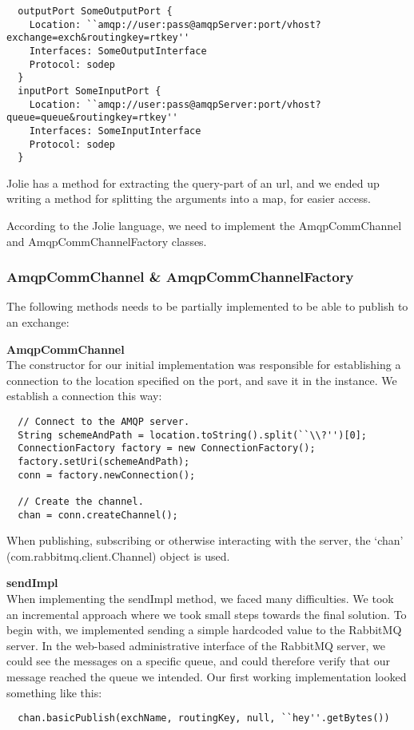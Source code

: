 \begin{lstlisting}
  outputPort SomeOutputPort {
    Location: ``amqp://user:pass@amqpServer:port/vhost?exchange=exch&routingkey=rtkey''
    Interfaces: SomeOutputInterface
    Protocol: sodep
  }
  inputPort SomeInputPort {
    Location: ``amqp://user:pass@amqpServer:port/vhost?queue=queue&routingkey=rtkey''
    Interfaces: SomeInputInterface
    Protocol: sodep
  }
\end{lstlisting}
Jolie has a method for extracting the query-part of an url, and we ended up writing a method for splitting the arguments into a map, for easier access.

According to the Jolie language, we need to implement the AmqpCommChannel and AmqpCommChannelFactory classes.
\subsubsection{AmqpCommChannel \& AmqpCommChannelFactory}
The following methods needs to be partially implemented to be able to publish to an exchange:

\noindent\textbf{AmqpCommChannel}\\
The constructor for our initial implementation was responsible for establishing a connection to the location specified on the port, and save it in the instance. We establish a connection this way:
\begin{lstlisting}
  // Connect to the AMQP server.
  String schemeAndPath = location.toString().split(``\\?'')[0];
  ConnectionFactory factory = new ConnectionFactory();
  factory.setUri(schemeAndPath);
  conn = factory.newConnection();

  // Create the channel.
  chan = conn.createChannel();
\end{lstlisting}
When publishing, subscribing or otherwise interacting with the server, the `chan' (com.rabbitmq.client.Channel) object is used.

\noindent\textbf{sendImpl}\\
When implementing the sendImpl method, we faced many difficulties. We took an incremental approach where we took small steps towards the final solution. To begin with, we implemented sending a simple hardcoded value to the RabbitMQ server. In the web-based administrative interface of the RabbitMQ server, we could see the messages on a specific queue, and could therefore verify that our message reached the queue we intended. Our first working implementation looked something like this:
\begin{lstlisting}
  chan.basicPublish(exchName, routingKey, null, ``hey''.getBytes())
\end{lstlisting}

